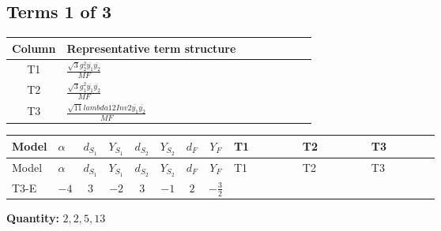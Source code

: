 \documentclass[8pt]{article}
\begin{document}
\begin{landscape}
\subsection*{Terms 1 of 3}
\begin{center}
\begin{tabular}{@{}c >{\raggedright\arraybackslash}p{0.82\linewidth}@{}}
\toprule
Column & Representative term structure \\
\midrule
T1 & \(\displaystyle \frac{\sqrt{3} g_{2}^{2} \overline{y_{1}} \overline{y_{2}}}{MF}\) \\
\midrule
T2 & \(\displaystyle \frac{\sqrt{3} g_{1}^{2} \overline{y_{1}} \overline{y_{2}}}{MF}\) \\
\midrule
T3 & \(\displaystyle \frac{\sqrt{11} lambda12Inv2 \overline{y_{1}} \overline{y_{2}}}{MF}\) \\
\midrule
\bottomrule
\end{tabular}
\end{center}
\smallskip
\tiny
\begin{longtable}{@{}llcccccc >{\raggedright\arraybackslash}p{0.21\linewidth} >{\raggedright\arraybackslash}p{0.21\linewidth} >{\raggedright\arraybackslash}p{0.21\linewidth}@{}}
\toprule
Model & $\alpha$ & $d_{S_1}$ & $Y_{S_1}$ & $d_{S_2}$ & $Y_{S_2}$ & $d_F$ & $Y_F$ & T1 & T2 & T3 \\
\midrule
\endfirsthead
\toprule
Model & $\alpha$ & $d_{S_1}$ & $Y_{S_1}$ & $d_{S_2}$ & $Y_{S_2}$ & $d_F$ & $Y_F$ & T1 & T2 & T3 \\
\midrule
\endhead
T3-E & $-4$ & $3$ & $-2$ & $3$ & $-1$ & $2$ & $-\frac{3}{2}$ & \scriptsize\adjustbox{max width=\linewidth}{$\begin{gathered} - \frac{49 \sqrt{3} g_{2}^{2} \overline{y_{1}} \overline{y_{2}}}{24 MF}\end{gathered}$} & \scriptsize\adjustbox{max width=\linewidth}{$\begin{gathered} - \frac{9 \sqrt{3} g_{1}^{2} \overline{y_{1}} \overline{y_{2}}}{8 MF}\end{gathered}$} & \scriptsize\adjustbox{max width=\linewidth}{$\begin{gathered} - \frac{3 \sqrt{11} lambda12Inv2 \overline{y_{1}} \overline{y_{2}}}{22 MF}\end{gathered}$} \\
\midrule
\bottomrule
\end{longtable}
\clearpage
\noindent\textbf{Quantity: }$\mathrm{2,2,5,13}$\par\smallskip

\end{landscape}
\end{document}
